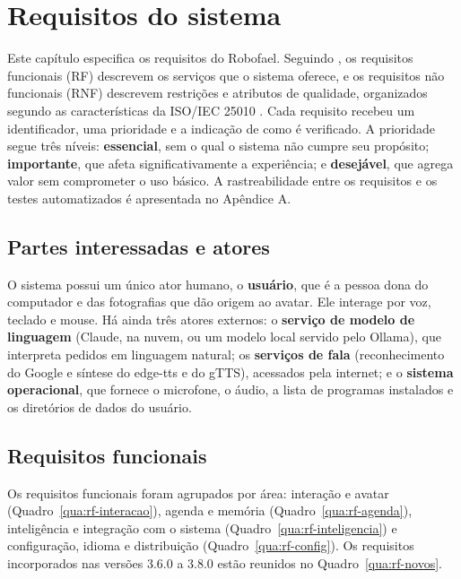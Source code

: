 \chapter{Requisitos do sistema}

Este capítulo especifica os requisitos do Robofael. Seguindo \textcite{sommerville2018}, os
requisitos funcionais (RF) descrevem os serviços que o sistema oferece, e os requisitos não funcionais
(RNF) descrevem restrições e atributos de qualidade, organizados segundo as características da
ISO/IEC 25010 \cite{iso25010}. Cada requisito recebeu um identificador, uma prioridade e a indicação
de como é verificado. A prioridade segue três níveis: \textbf{essencial}, sem o qual o sistema não
cumpre seu propósito; \textbf{importante}, que afeta significativamente a experiência; e
\textbf{desejável}, que agrega valor sem comprometer o uso básico. A rastreabilidade entre os
requisitos e os testes automatizados é apresentada no Apêndice A.

\section{Partes interessadas e atores}

O sistema possui um único ator humano, o \textbf{usuário}, que é a pessoa dona do computador e das
fotografias que dão origem ao avatar. Ele interage por voz, teclado e mouse. Há ainda três atores
externos: o \textbf{serviço de modelo de linguagem} (Claude, na nuvem, ou um modelo local servido pelo
Ollama), que interpreta pedidos em linguagem natural; os \textbf{serviços de fala} (reconhecimento do Google e síntese do edge-tts e do gTTS),
acessados pela internet; e o \textbf{sistema operacional}, que fornece o microfone, o áudio, a lista de
programas instalados e os diretórios de dados do usuário.

\section{Requisitos funcionais}

Os requisitos funcionais foram agrupados por área: interação e avatar (Quadro~\ref{qua:rf-interacao}),
agenda e memória (Quadro~\ref{qua:rf-agenda}), inteligência e integração com o sistema
(Quadro~\ref{qua:rf-inteligencia}) e configuração, idioma e distribuição (Quadro~\ref{qua:rf-config}).
Os requisitos incorporados nas versões 3.6.0 a 3.8.0 estão reunidos no Quadro~\ref{qua:rf-novos}.

